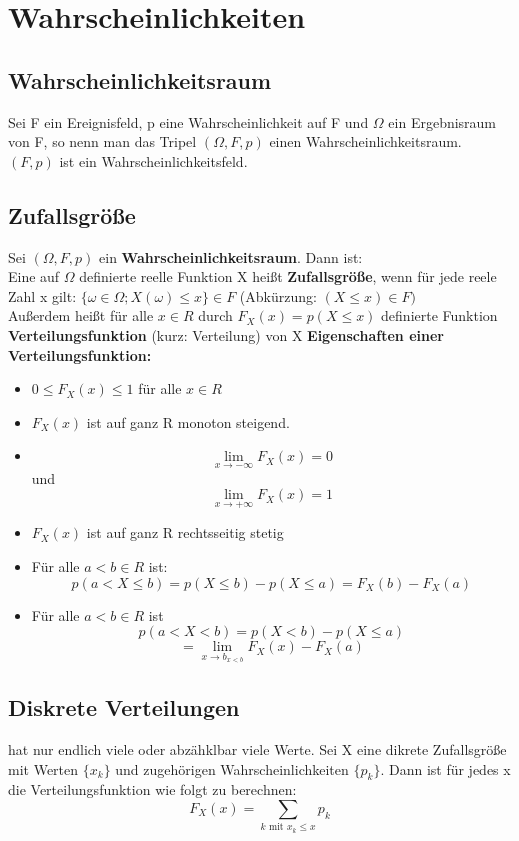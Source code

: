 \documentclass[german]{latex4ei/latex4ei_sheet}
\begin{document}
\section{Wahrscheinlichkeiten}
\begin{sectionbox}

\subsection{Wahrscheinlichkeitsraum}
Sei F ein  Ereignisfeld, p eine Wahrscheinlichkeit auf F und $\Omega$ ein Ergebnisraum von F, so nenn man das Tripel $(\Omega, F, p )$ einen Wahrscheinlichkeitsraum. $(F,p)$ ist ein Wahrscheinlichkeitsfeld. 

\subsection{Zufallsgröße}
Sei $(\Omega, F, p)$ ein \textbf{Wahrscheinlichkeitsraum}. Dann ist: \\
Eine auf $\Omega $ definierte reelle Funktion X heißt \textbf{Zufallsgröße}, wenn für jede reele Zahl x gilt:
$\{\omega \in \Omega; X(\omega) \leq x\} \in F $ (Abkürzung: $(X\leq x) \in F)$ \\

Außerdem heißt für alle $x\in R$ durch
$F_{X}(x) = p(X \leq x) $ definierte Funktion \textbf{Verteilungsfunktion} (kurz: Verteilung) von X
\textbf{Eigenschaften einer Verteilungsfunktion:}
\begin{itemize}
  \item $0 \leq F_{X}(x) \leq 1 $ für alle $x \in R$
  \item $ F_{X}(x)$ ist auf ganz R monoton steigend.
  \item $$\lim_{x \to -\infty}F_{X}(x) = 0 $$ und $$\lim_{x \to +\infty}F_{X}(x) = 1 $$
  \item $F_X(x)$ ist auf ganz R rechtsseitig stetig
  \item Für alle $a < b \in R$ ist:
  $$ p(a<X \leq b) = p(X \leq b) - p(X\leq a) = F_X(b) - F_X(a)$$
  \item Für alle $a <b \in R$ ist
  $$ p(a<X < b) = p(X < b) - p(X\leq a) $$
  $$= \lim_{x\to b_{x<b}}F_X(x) - F_X(a)$$
\end{itemize}

\subsection{Diskrete Verteilungen} 
hat nur endlich viele oder abzähklbar viele Werte.
Sei X eine dikrete Zufallsgröße mit Werten $\{x_k\}$ und zugehörigen Wahrscheinlichkeiten $\{p_k\}$. Dann ist für jedes x die Verteilungsfunktion wie folgt zu berechnen:
$$ F_X(x) = \sum_{k \text{ mit } x_k \leq x} p_k$$


\end{sectionbox}
\end{document}
